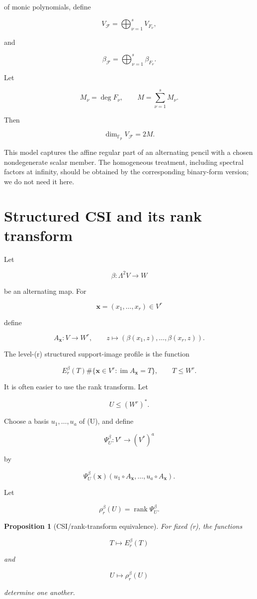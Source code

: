 \documentclass[11pt]{article}
\newtheorem{proposition}[theorem]{Proposition}
\begin{document}
of monic polynomials, define

\[
V_{\mathcal F}=\bigoplus_{\nu=1}^s V_{F_\nu},
\]

and

\[
\beta_{\mathcal F}=\bigoplus_{\nu=1}^s \beta_{F_\nu}.
\]

Let

\[
M_\nu=\deg F_\nu,
\qquad
M=\sum_{\nu=1}^s M_\nu.
\]

Then

\[
\dim_{\mathbb F_p} V_{\mathcal F}=2M.
\]

This model captures the affine regular part of an alternating pencil with a chosen nondegenerate scalar member. The homogeneous treatment, including spectral factors at infinity, should be obtained by the corresponding binary-form version; we do not need it here.

\section{Structured CSI and its rank transform}

Let

\[
\beta:\Lambda^2V\to W
\]

be an alternating map. For

\[
\mathbf x=(x_1,\ldots,x_r)\in V^r
\]

define

\[
A_{\mathbf x}:V\to W^r,
\qquad
z\mapsto
(\beta(x_1,z),\ldots,\beta(x_r,z)).
\]

The level-(r) structured support-image profile is the function

\[
E_r^\beta(T)
\#\{\mathbf x\in V^r:\operatorname{im}A_{\mathbf x}=T\},
\qquad
T\le W^r.
\]

It is often easier to use the rank transform. Let

\[
U\le (W^r)^*.
\]

Choose a basis $u_1,\ldots,u_a$ of (U), and define

\[
\Psi_U^\beta:V^r\to (V^*)^a
\]

by

\[
\Psi_U^\beta(\mathbf x)
(u_1\circ A_{\mathbf x},\ldots,u_a\circ A_{\mathbf x}).
\]

Let

\[
\rho_r^\beta(U)=\operatorname{rank}\Psi_U^\beta.
\]

\begin{proposition}[CSI/rank-transform equivalence]
For fixed (r), the functions

\[
T\mapsto E_r^\beta(T)
\]

and

\[
U\mapsto \rho_r^\beta(U)
\]

determine one another.

\end{proposition}
\end{document}
